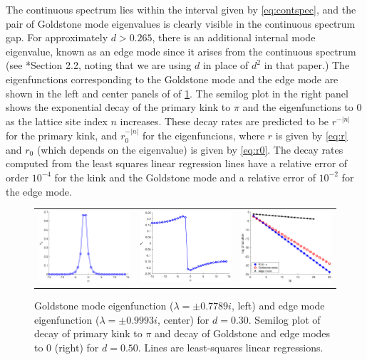 \documentclass[12pt]{article}
\begin{document}
The continuous spectrum lies within the interval given by \cref{eq:contspec}, and the pair of Goldstone mode eigenvalues is clearly visible in the continuous spectrum gap. For approximately $d > 0.265$, there is an additional internal mode eigenvalue, known as an edge mode since it arises from the continuous spectrum (see \cite{KevrekidisWeinstein2000}*{Section 2.2}, noting that we are using $d$ in place of $d^2$ in that paper.) The eigenfunctions corresponding to the Goldstone mode and the edge mode are shown in the left and center panels of of \cref{fig:kinkeig}. The semilog plot in the right panel shows the exponential decay of the primary kink to $\pi$ and the eigenfunctions to 0 as the lattice site index $n$ increases. These decay rates are predicted to be $r^{-|n|}$ for the primary kink, and $r_0^{-|n|}$ for the eigenfuncions, where $r$ is given by \cref{eq:r} and $r_0$ (which depends on the eigenvalue) is given by \cref{eq:r0}. The decay rates computed from the least squares linear regression lines have a relative error of order $10^{-4}$ for the kink and the Goldstone mode and a relative error of $10^{-2}$ for the edge mode.

\begin{figure}[H]
	\begin{center}
	\begin{tabular}{ccc}
	\includegraphics[width=5cm]{1kinkgoldstonemode.eps} &
	\includegraphics[width=5cm]{1kinkedgemode.eps} &
	\includegraphics[width=5cm]{decayplot.eps}
	\end{tabular}
	\end{center}
	\caption{Goldstone mode eigenfunction ($\lambda = \pm 0.7789 i$, left) and edge mode eigenfunction ($\lambda = \pm 0.9993 i$, center) for $d = 0.30$. Semilog plot of decay of primary kink to $\pi$ and decay of Goldstone and edge modes to 0 (right) for $d = 0.50$. Lines are least-squares linear regressions.}
	\label{fig:kinkeig}
\end{figure}
\end{document}
